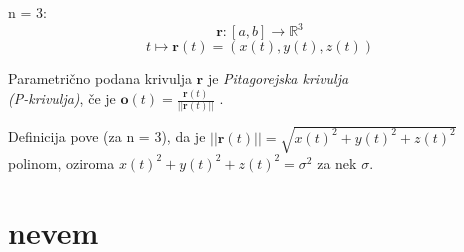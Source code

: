 \documentclass[mat1]{fmfdelo}
\newcommand{\R}{\mathbb R}
\newcommand{\rr}{\boldsymbol r}
\begin{document}
\begin{primer}
n = 3:
\begin{equation*}
\rr:[a,b] \rightarrow \R^3
\end{equation*}
\begin{equation*}
t \longmapsto \rr(t) = (x(t),y(t),z(t))
\end{equation*}
\end{primer}
\begin{definicija}
Parametrično podana krivulja $\rr$ je \textit{Pitagorejska krivulja\\ (P-krivulja)}, če je $\boldsymbol{o}(t) = \frac{\rr(t)}{||\rr(t)||}$ .
\end{definicija}
\begin{opomba}
Definicija pove (za n = 3), da je $||\rr(t)|| = \sqrt{x(t)^2 + y(t)^2 + z(t)^2}$ polinom, oziroma $x(t)^2 + y(t)^2 + z(t)^2 = \sigma^2$ za nek $\sigma$.
\end{opomba}


\section{nevem}
\end{document}
